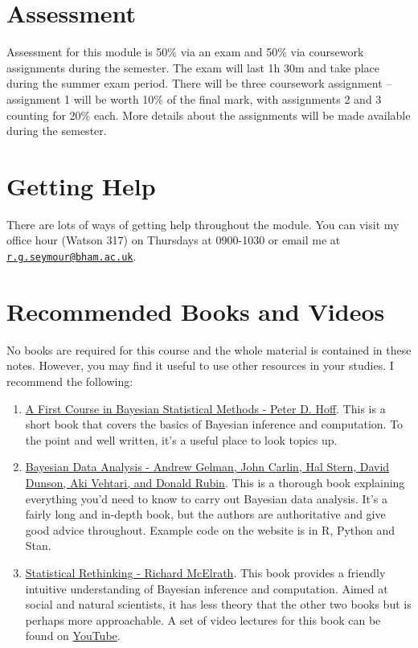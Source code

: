 \documentclass[
]{book}
\theoremstyle{definition}
\theoremstyle{definition}
\theoremstyle{definition}
\theoremstyle{definition}
\theoremstyle{remark}
\begin{document}
\hypertarget{assessment}{%
\section{Assessment}\label{assessment}}

Assessment for this module is 50\% via an exam and 50\% via coursework
assignments during the semester. The exam will last 1h 30m and take
place during the summer exam period. There will be three coursework
assignment -- assignment 1 will be worth 10\% of the final mark, with
assignments 2 and 3 counting for 20\% each. More details about the
assignments will be made available during the semester.

\hypertarget{getting-help}{%
\section{Getting Help}\label{getting-help}}

There are lots of ways of getting help throughout the module. You can
visit my office hour (Watson 317) on Thursdays at 0900-1030 or email me at
\href{mailto:r.g.seymour@bham.ac.uk}{\nolinkurl{r.g.seymour@bham.ac.uk}}.

\hypertarget{recommended-books-and-videos}{%
\section{Recommended Books and Videos}\label{recommended-books-and-videos}}

No books are required for this course and the whole material is
contained in these notes. However, you may find it useful to use other
resources in your studies. I recommend the following:

\begin{enumerate}
\def\labelenumi{\arabic{enumi}.}
\item
  \href{https://link.springer.com/book/10.1007/978-0-387-92407-6}{A First Course in Bayesian Statistical Methods - Peter D.
  Hoff}.
  This is a short book that covers the basics of Bayesian inference
  and computation. To the point and well written, it's a useful place
  to look topics up.
\item
  \href{http://www.stat.columbia.edu/~gelman/book/}{Bayesian Data Analysis - Andrew Gelman, John Carlin, Hal Stern,
  David Dunson, Aki Vehtari, and Donald
  Rubin}. This is a
  thorough book explaining everything you'd need to know to carry out
  Bayesian data analysis. It's a fairly long and in-depth book, but
  the authors are authoritative and give good advice throughout.
  Example code on the website is in R, Python and Stan.
\item
  \href{https://xcelab.net/rm/statistical-rethinking/}{Statistical Rethinking - Richard
  McElrath}. This book
  provides a friendly intuitive understanding of Bayesian inference
  and computation. Aimed at social and natural scientists, it has less
  theory that the other two books but is perhaps more approachable. A
  set of video lectures for this book can be found on
  \href{https://www.youtube.com/playlist?list=PLDcUM9US4XdMROZ57-OIRtIK0aOynbgZN}{YouTube}.
\end{enumerate}
\end{document}
